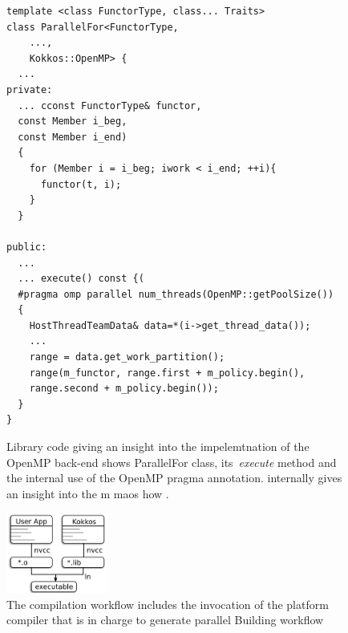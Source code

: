 \begin{figure}
\begin{small}
\begin{Verbatim}[frame=leftline]
template <class FunctorType, class... Traits>
class ParallelFor<FunctorType, 
    ..., 
    Kokkos::OpenMP> {
  ...
private:
  ... cconst FunctorType& functor, 
  const Member i_beg,
  const Member i_end) 
  {
    for (Member i = i_beg; iwork < i_end; ++i){
      functor(t, i);
    }
  }

public:
  ...
  ... execute() const {(
  #pragma omp parallel num_threads(OpenMP::getPoolSize())
  {
    HostThreadTeamData& data=*(i->get_thread_data());
    ...
    range = data.get_work_partition();
    range(m_functor, range.first + m_policy.begin(),
    range.second + m_policy.begin());
  }
}

\end{Verbatim}
\end{small}
\caption{Library code giving an  insight into the impelemtnation of the OpenMP back-end shows ParallelFor class, its~\emph{execute} method and the internal use of the OpenMP pragma annotation.  internally gives an insight into the m maos how .}
\label{fig:KokkosExampleOMPBackEnd}
\end{figure}


\begin{figure}
\centerline{\includegraphics[width=0.3\textwidth]{img/Build.png}}
\caption{The compilation workflow includes the invocation of the platform compiler that is in charge to generate parallel   Building workflow}
\label{fig:workflow}
\end{figure}